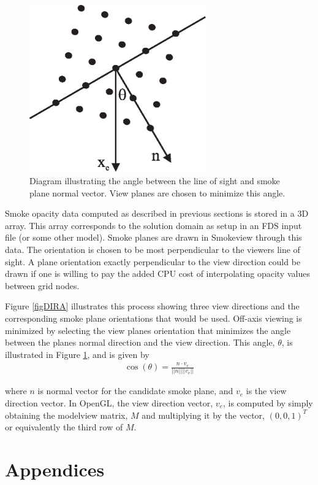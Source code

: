 \documentclass[11pt,twoside]{book}
\begin{document}
\begin{figure}
\centerline{\includegraphics[width=3.0in]{figures/figDIRB}}
\caption{Diagram illustrating the angle between the line of sight
and smoke plane normal vector.  View planes are chosen to minimize
this angle.} \label{figDIRB}
\end{figure}
Smoke opacity data computed as described in previous sections is stored in a 3D array.
This array corresponds to the solution domain as setup in an FDS input file (or some other model).
Smoke planes are drawn in Smokeview through this data.  The orientation is chosen to be most perpendicular
to the viewers line of sight.  A plane orientation exactly perpendicular to the view direction could be drawn
if one is willing to pay the added CPU cost of interpolating opacity values between grid nodes.

Figure \ref{figDIRA} illustrates this process showing three view directions and the corresponding smoke plane orientations that would be used.
Off-axis viewing is minimized by selecting the view planes orientation that minimizes the angle between the planes normal direction and the view direction.
This angle, $\theta$, is illustrated in Figure \ref{figDIRB}, and is given by
\begin{eqnarray*}
\cos(\theta)=\frac{n\cdot v_e}{||n||||v_e||}
\end{eqnarray*}

\noindent where $n$ is normal vector for the candidate smoke plane, and $v_e$ is
the view direction vector.  In OpenGL, the view direction vector,
$v_e$, is computed by simply obtaining the modelview matrix, $M$
and multiplying it by the vector, $(0,0,1)^T$ or equivalently the
third row of $M$.


\part{Appendices}
\appendix
\end{document}
